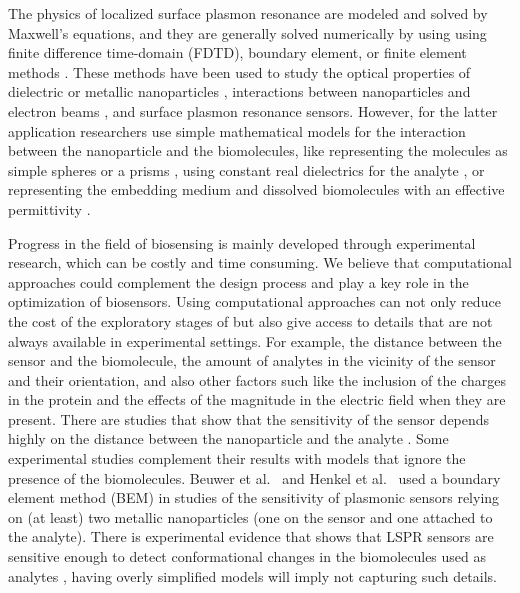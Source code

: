The physics of localized surface plasmon resonance are modeled and solved by Maxwell's equations, and they are generally solved numerically 
by using using finite difference time-domain (FDTD), boundary element, or finite element methods \cite{SolisTaboadaObelleiroLiz-MaarzanGarciadeabajo2014}.
These methods have been used to study 
the optical properties of dielectric or metallic nanoparticles \cite{Hohenester2018,HohenesterTrugler2012,
JungPedersenSondergaardPedersenLarsenNielsen2010, VideenSun2003,
MayergoyzFredkinZhang2005, MayergoyzZhang2007}, interactions between nanoparticles
and electron beams \cite{GarciadeabajoAizpurua1997, GarciadeabajoHowie2002},
and surface plasmon resonance sensors. However, for the latter application researchers use simple mathematical models for the interaction 
between the nanoparticle and the biomolecules, like representing the molecules as simple spheres \cite{DavisGomezVernon2010,AntosiewiczApellClaudioKall2011, SantiagoCordobaETal2011, ShenETal2013, UngerETal2009}
or a prisms \cite{DanHu2014}, using constant real dielectrics for the analyte \cite{NghiemETal2012, SantiagoCordobaETal2011, ShenETal2013, UngerETal2009}, 
or representing the embedding medium and dissolved biomolecules with an effective permittivity \cite{JungCampbellChinowskyMarYee1998,WilletsVandyune2007,PhanETal2013}.

Progress in the field of biosensing is mainly developed through experimental research, which can be costly and time consuming. We believe that 
computational approaches could complement the design process and play a key role in the optimization of biosensors. Using computational approaches
can not only reduce the cost of the exploratory stages of but also give access to details that are not always available in experimental settings. For example, 
the distance between the sensor and the biomolecule, the amount of analytes in the vicinity of the sensor and their orientation, and also other factors such like
the inclusion of the charges in the protein and the effects of the magnitude in the electric field when they are present. There are studies that show that 
the sensitivity of the sensor depends highly on the distance between the nanoparticle and the analyte \cite{HaesETal2004}. Some experimental studies complement
their results with models that ignore the presence of the biomolecules. Beuwer et al.~\cite{BeuwervanHoofZijlstra2018} and Henkel et al.~\cite{HenkelETal2018} 
used a boundary element method (BEM) in studies of the sensitivity of plasmonic sensors relying on (at least) two metallic nanoparticles 
(one on the sensor and one attached to the analyte). There is experimental evidence that shows that LSPR sensors are sensitive enough to detect conformational
changes in the biomolecules used as analytes \cite{HallETal2011}, having overly simplified models will imply not capturing such details. 


